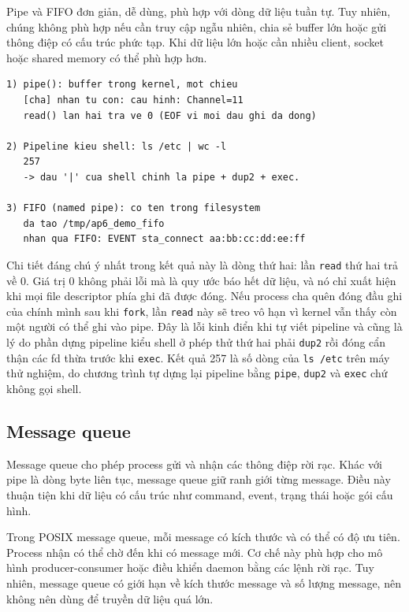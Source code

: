 \documentclass[11pt]{article}
\newcommand{\code}[1]{\texttt{#1}}
\begin{document}
Pipe và FIFO đơn giản, dễ dùng, phù hợp với dòng dữ liệu tuần tự. Tuy nhiên, chúng không phù hợp nếu cần truy cập ngẫu nhiên, chia sẻ buffer lớn hoặc gửi thông điệp có cấu trúc phức tạp. Khi dữ liệu lớn hoặc cần nhiều client, socket hoặc shared memory có thể phù hợp hơn.

\begin{lstlisting}[caption={pipe, EOF và FIFO có tên trong filesystem}]
1) pipe(): buffer trong kernel, mot chieu
   [cha] nhan tu con: cau hinh: Channel=11
   read() lan hai tra ve 0 (EOF vi moi dau ghi da dong)

2) Pipeline kieu shell: ls /etc | wc -l
   257
   -> dau '|' cua shell chinh la pipe + dup2 + exec.

3) FIFO (named pipe): co ten trong filesystem
   da tao /tmp/ap6_demo_fifo
   nhan qua FIFO: EVENT sta_connect aa:bb:cc:dd:ee:ff
\end{lstlisting}

Chi tiết đáng chú ý nhất trong kết quả này là dòng thứ hai: lần \code{read} thứ hai trả về 0. Giá trị 0 không phải lỗi mà là quy ước báo hết dữ liệu, và nó chỉ xuất hiện khi mọi file descriptor phía ghi đã được đóng. Nếu process cha quên đóng đầu ghi của chính mình sau khi \code{fork}, lần \code{read} này sẽ treo vô hạn vì kernel vẫn thấy còn một người có thể ghi vào pipe. Đây là lỗi kinh điển khi tự viết pipeline và cũng là lý do phần dựng pipeline kiểu shell ở phép thử thứ hai phải \code{dup2} rồi đóng cẩn thận các fd thừa trước khi \code{exec}. Kết quả 257 là số dòng của \code{ls /etc} trên máy thử nghiệm, do chương trình tự dựng lại pipeline bằng \code{pipe}, \code{dup2} và \code{exec} chứ không gọi shell.

\subsection{Message queue}

Message queue cho phép process gửi và nhận các thông điệp rời rạc. Khác với pipe là dòng byte liên tục, message queue giữ ranh giới từng message. Điều này thuận tiện khi dữ liệu có cấu trúc như command, event, trạng thái hoặc gói cấu hình.

Trong POSIX message queue, mỗi message có kích thước và có thể có độ ưu tiên. Process nhận có thể chờ đến khi có message mới. Cơ chế này phù hợp cho mô hình producer-consumer hoặc điều khiển daemon bằng các lệnh rời rạc. Tuy nhiên, message queue có giới hạn về kích thước message và số lượng message, nên không nên dùng để truyền dữ liệu quá lớn.
\end{document}
